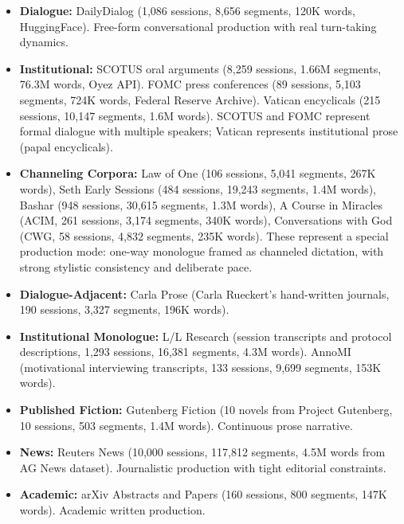 \documentclass[final]{clv2025}
\begin{document}
\begin{itemize}
\item \textbf{Dialogue:} DailyDialog (1,086 sessions, 8,656 segments, 120K words, HuggingFace). Free-form conversational production with real turn-taking dynamics.

\item \textbf{Institutional:} SCOTUS oral arguments (8,259 sessions, 1.66M segments, 76.3M words, Oyez API). FOMC press conferences (89 sessions, 5,103 segments, 724K words, Federal Reserve Archive). Vatican encyclicals (215 sessions, 10,147 segments, 1.6M words). SCOTUS and FOMC represent formal dialogue with multiple speakers; Vatican represents institutional prose (papal encyclicals).

\item \textbf{Channeling Corpora:} Law of One (106 sessions, 5,041 segments, 267K words), Seth Early Sessions (484 sessions, 19,243 segments, 1.4M words), Bashar (948 sessions, 30,615 segments, 1.3M words), A Course in Miracles (ACIM, 261 sessions, 3,174 segments, 340K words), Conversations with God (CWG, 58 sessions, 4,832 segments, 235K words). These represent a special production mode: one-way monologue framed as channeled dictation, with strong stylistic consistency and deliberate pace.

\item \textbf{Dialogue-Adjacent:} Carla Prose (Carla Rueckert's hand-written journals, 190 sessions, 3,327 segments, 196K words).

\item \textbf{Institutional Monologue:} L/L Research (session transcripts and protocol descriptions, 1,293 sessions, 16,381 segments, 4.3M words). AnnoMI (motivational interviewing transcripts, 133 sessions, 9,699 segments, 153K words).

\item \textbf{Published Fiction:} Gutenberg Fiction (10 novels from Project Gutenberg, 10 sessions, 503 segments, 1.4M words). Continuous prose narrative.

\item \textbf{News:} Reuters News (10,000 sessions, 117,812 segments, 4.5M words from AG News dataset). Journalistic production with tight editorial constraints.

\item \textbf{Academic:} arXiv Abstracts and Papers (160 sessions, 800 segments, 147K words). Academic written production.

\end{itemize}
\end{document}
